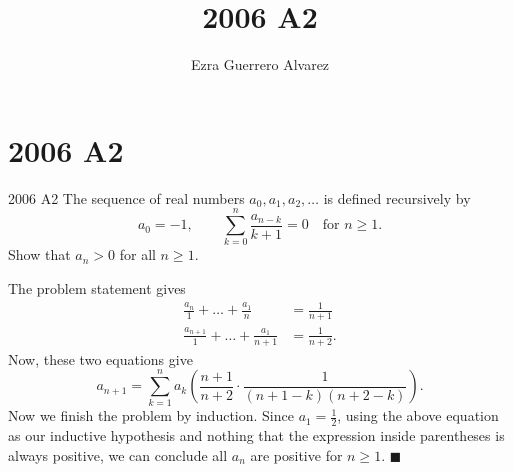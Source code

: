 \documentclass[14pt]{article}
\title{2006 A2}
\author{Ezra Guerrero Alvarez}
\begin{document}
\maketitle
	
\section*{2006 A2}

\begin{statement}{2006 A2}
	The sequence of real numbers $a_0,a_1,a_2,\ldots$ is defined recursively by
	\[a_0=-1, \qquad \sum_{k=0}^n \frac{a_{n-k}}{k+1} = 0
	\quad\text{for } n \geq 1.\]
	Show that $ a_{n} > 0$ for all $ n\geq 1$.
\end{statement}
The problem statement gives
\begin{align*}
	\frac{a_n}1+\ldots+\frac{a_1}n&=\frac1{n+1}\\
	\frac{a_{n+1}}1+\ldots+\frac{a_1}{n+1}&=\frac1{n+2}.
\end{align*}
Now, these two equations give
\[ a_{n+1}=\sum_{k=1}^n a_k\left(\frac{n+1}{n+2}\cdot\frac1{(n+1-k)(n+2-k)}\right). \]
Now we finish the problem by induction. Since $a_1=\frac12$, using the above equation as our inductive hypothesis and nothing that the expression inside parentheses is always positive, we can conclude all $a_n$ are positive for $n\ge1$. $\blacksquare$
	
\end{document}
